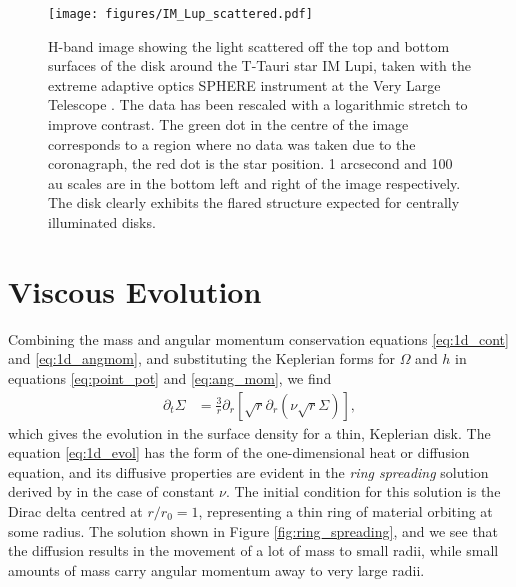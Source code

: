\begin{figure}
    \centering
    \texttt{[image: figures/IM\_Lup\_scattered.pdf]}
    \caption{H-band image showing the light scattered off the top and bottom surfaces of the disk around the T-Tauri star IM Lupi, taken with the extreme adaptive optics SPHERE instrument at the Very Large Telescope \citep{avenhaus2018}.
    The data has been rescaled with a logarithmic stretch to improve contrast.
    The green dot in the centre of the image corresponds to a region where no data was taken due to the coronagraph, the red dot is the star position.
    1 arcsecond and 100 au scales are in the bottom left and right of the image respectively.
    The disk clearly exhibits the flared structure expected for centrally illuminated disks.}
    \label{fig:im_lup}
\end{figure}

\section{Viscous Evolution}

Combining the mass and angular momentum conservation equations \ref{eq:1d_cont} and \ref{eq:1d_angmom}, and substituting the Keplerian forms for $\Omega$ and $h$ in equations \ref{eq:point_pot} and \ref{eq:ang_mom}, we find
\begin{align}
    \partial_t \Sigma &= \frac{3}{r} \partial_r \left[ \sqrt{r} \partial_r \left( \nu \sqrt{r} \Sigma  \right)  \right] \label{eq:1d_evol},
\end{align}
which gives the evolution in the surface density for a thin, Keplerian disk.
The equation \ref{eq:1d_evol} has the form of the one-dimensional heat or diffusion equation, and its diffusive properties are evident in the \textit{ring spreading} solution derived by \citet{lynden-bell1974} in the case of constant $\nu$.
The initial condition for this solution is the Dirac delta centred at $r/r_0 = 1$, representing a thin ring of material orbiting at some radius.
The solution shown in Figure \ref{fig:ring_spreading}, and we see that the diffusion results in the movement of a lot of mass to small radii, while small amounts of mass carry angular momentum away to very large radii.

